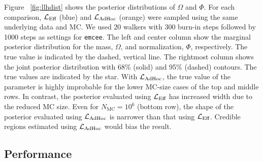 \documentclass[a4paper, 11pt]{article}
\newcommand{\like}{\mathcal{L}}
\newcommand{\mcl}{\like_\textmd{Eff}}
\newcommand{\adhoc}{\mathcal{L}_{\textmd{AdHoc}}}
\newcommand{\emcee}{\texttt{emcee}}
\begin{document}
Figure ~\ref{fig:llhdist} shows the posterior distributions of $\Omega$ and $\Phi$. For each comparison, $\mcl$ (blue) and $\adhoc$ (orange) were sampled using the same underlying data and MC. We used 20 walkers with 300 burn-in steps followed by 1000 steps as settings for \emcee. The left and center column show the marginal posterior distribution for the mass, $\Omega$, and normalization, $\Phi$, respectively. The true value is indicated by the dashed, vertical line. The rightmost column shows the joint posterior distribution with 68\% (solid) and 95\% (dashed) contours. The true values are indicated by the star. With $\adhoc$, the true value of the parameter is highly improbable for the lower MC-size cases of the top and middle rows. In contrast, the posterior evaluated using $\mcl$ has increased width due to the reduced MC size. Even for $N_\mathrm{MC}=10^6$ (bottom row), the shape of the posterior evaluated using $\adhoc$ is narrower than that using $\mcl$. Credible regions estimated using $\adhoc$ would bias the result.

\subsection{Performance\label{sec:performance}}
\end{document}
